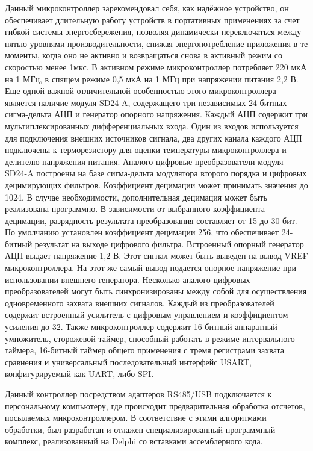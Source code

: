 Данный микроконтроллер зарекомендовал себя, как надёжное устройство, он обеспечивает длительную работу устройств в портативных применениях за счет гибкой системы энергосбережения, позволяя динамически переключаться между пятью уровнями производительности, снижая энергопотребление приложения в те моменты, когда оно не активно и возвращаться снова в активный режим со скоростью менее 1мкс. В активном режиме микроконтроллер потребляет 220 мкА на 1 МГц, в спящем режиме 0,5 мкА на 1 МГц при напряжении питания 2,2 В. Еще одной важной отличительной особенностью этого микроконтроллера является наличие модуля SD24-A, содержащего три независимых 24-битных сигма-дельта АЦП и генератор опорного напряжения. Каждый АЦП содержит три мультиплексированных дифференциальных входа. Один из входов используется для подключения внешних источников сигнала, два других канала каждого АЦП подключены к терморезистору для оценки температуры микроконтроллера и делителю напряжения питания. Аналого-цифровые преобразователи модуля SD24-A построены на базе сигма-дельта модулятора второго порядка и цифровых децимирующих фильтров. Коэффициент децимации может принимать значения до 1024. В случае необходимости, дополнительная децимация может быть реализована программно. В зависимости от выбранного коэффициента децимации, разрядность результата преобразования составляет от 15 до 30 бит. По умолчанию установлен коэффициент децимации 256, что обеспечивает 24-битный результат на выходе цифрового фильтра. Встроенный опорный генератор АЦП выдает напряжение 1,2 В. Этот сигнал может быть выведен на вывод VREF микроконтроллера. На этот же самый вывод подается опорное напряжение при использовании внешнего генератора. Несколько аналого-цифровых преобразователей могут быть синхронизированы между собой для осуществления одновременного захвата внешних сигналов. Каждый из преобразователей содержит встроенный усилитель с цифровым управлением и коэффициентом усиления до 32. Также микроконтроллер содержит 16-битный аппаратный умножитель, сторожевой таймер, способный работать в режиме интервального таймера, 16-битный таймер общего применения с тремя регистрами захвата сравнения и универсальный последовательный интерфейс USART, конфигурируемый как UART, либо SPI.

Данный контроллер посредством адаптеров RS485/USB подключается к персональному компьютеру, где происходит предварительная обработка отсчетов, посылаемых микроконтроллером. В соответствие с этими алгоритмами обработки, был разработан и отлажен специализированный программный комплекс, реализованный на Delphi со вставками ассемблерного кода.



